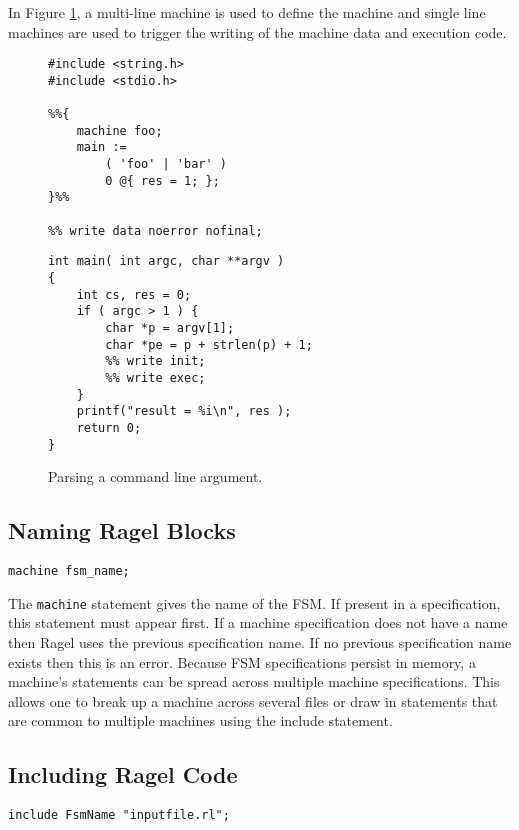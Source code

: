 \documentclass[letterpaper,11pt,oneside]{book}
\newcommand{\verbspace}{\vspace{10pt}}
\begin{document}
In Figure \ref{cmd-line-parsing}, a multi-line machine is used to define the
machine and single line machines are used to trigger the writing of the machine
data and execution code.

\begin{figure}
\begin{multicols}{2}
\small
\begin{verbatim}
#include <string.h>
#include <stdio.h>

%%{ 
    machine foo;
    main := 
        ( 'foo' | 'bar' ) 
        0 @{ res = 1; };
}%%

%% write data noerror nofinal;
\end{verbatim}
\columnbreak
\begin{verbatim}
int main( int argc, char **argv )
{
    int cs, res = 0;
    if ( argc > 1 ) {
        char *p = argv[1];
        char *pe = p + strlen(p) + 1;
        %% write init;
        %% write exec;
    }
    printf("result = %i\n", res );
    return 0;
}
\end{verbatim}
\end{multicols}
\caption{Parsing a command line argument.}
\label{cmd-line-parsing}
\end{figure}


\subsection{Naming Ragel Blocks}

\begin{verbatim}
machine fsm_name;
\end{verbatim}
\verbspace

The \verb|machine| statement gives the name of the FSM. If present in a
specification, this statement must appear first. If a machine specification
does not have a name then Ragel uses the previous specification name.  If no
previous specification name exists then this is an error. Because FSM
specifications persist in memory, a machine's statements can be spread across
multiple machine specifications.  This allows one to break up a machine across
several files or draw in statements that are common to multiple machines using
the include statement.

\subsection{Including Ragel Code}

\begin{verbatim}
include FsmName "inputfile.rl";
\end{verbatim}
\verbspace
\end{document}
